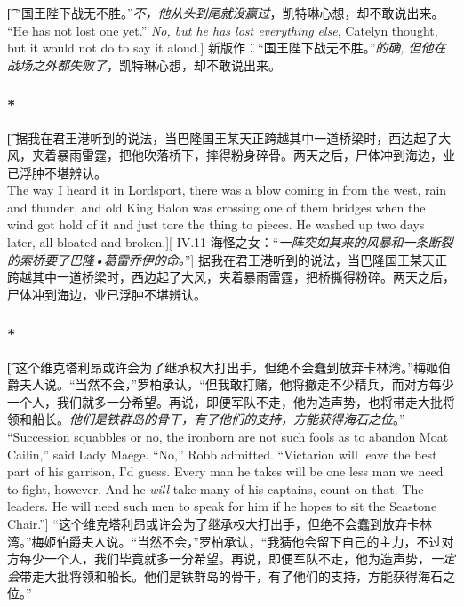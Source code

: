 \documentclass[12pt,a4paper]{article}
\begin{document}
\subsubsection{}\t[	
	“国王陛下战无不胜。”\emph{不，他从头到尾就没赢过}，凯特琳心想，却不敢说出来。\\
	“He has not lost one yet.” \emph{No, but he has lost everything else}, Catelyn thought, but it would not do to say it aloud.]
	新版作：“国王陛下战无不胜。”\emph{的确, 但他在战场之外都失败了}，凯特琳心想，却不敢说出来。
	
\subsubsection{\color{red}*}\t[
	 据我在君王港听到的说法，当巴隆国王某天正跨越其中一道桥梁时，西边起了大风，夹着暴雨雷霆，把他吹落桥下，摔得粉身碎骨。两天之后，尸体冲到海边，业已浮肿不堪辨认。\\
	 The way I heard it in Lordsport, there was a blow coming in from the west, rain and thunder, and old King Balon was crossing one of them bridges when the wind got hold of it and just tore the thing to pieces. He washed up two days later, all bloated and broken.][
	 IV.11 海怪之女：“\emph{一阵突如其来的风暴和一条断裂的索桥要了巴隆•葛雷乔伊的命。}”]
	 据我在君王港听到的说法，当巴隆国王某天正跨越其中一道桥梁时，西边起了大风，夹着暴雨雷霆，把桥撕得粉碎。两天之后，尸体冲到海边，业已浮肿不堪辨认。
	 
\subsubsection{\color{red}*}\t[
	这个维克塔利昂或许会为了继承权大打出手，但绝不会蠢到放弃卡林湾。”梅姬伯爵夫人说。“当然不会，”罗柏承认，“但我敢打赌，他将撤走不少精兵，而对方每少一个人，我们就多一分希望。再说，即便军队不走，他为造声势，也将带走大批将领和船长。\emph{他们是铁群岛的骨干，有了他们的支持，方能获得海石之位}。”\\
	“Succession squabbles or no, the ironborn are not such fools as to abandon Moat Cailin,” said Lady Maege. “No,” Robb admitted. “Victarion will leave the best part of his garrison, I'd guess. Every man he takes will be one less man we need to fight, however. And he \emph{will} take many of his captains, count on that. The leaders. He will need such men to speak for him if he hopes to sit the Seastone Chair.”]
	“这个维克塔利昂或许会为了继承权大打出手，但绝不会蠢到放弃卡林湾。”梅姬伯爵夫人说。“当然不会，”罗柏承认，“我猜他会留下自己的主力，不过对方每少一个人，我们毕竟就多一分希望。再说，即便军队不走，他为造声势，\emph{一定会}带走大批将领和船长。他们是铁群岛的骨干，有了他们的支持，方能获得海石之位。”
	
\end{document}

